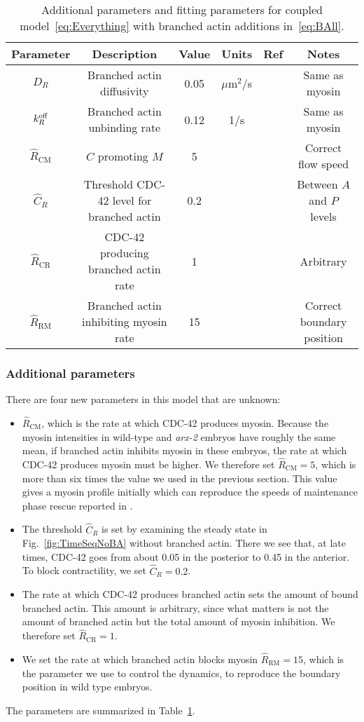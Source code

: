 \documentclass[11pt]{article}
\newcommand{\red}[1]{\color{red}#1\normalcolor}
\newcommand{\6}[1]{#1_{\text{6}}}
\newcommand{\3}[1]{#1_{\text{3}}}
\begin{document}
\begin{table}
\begin{small}
\centering
\begin{tabular}{|c|c|c|c|c|c|}\hline
Parameter & Description & Value & Units & Ref & Notes \\ \hline
$D_R$ & Branched actin diffusivity & 0.05 & $\mu$m$^2$/s & & Same as myosin \\
$k^\text{off}_R$ & Branched actin unbinding rate & 0.12 & 1/s & & Same as myosin \\ \hline
$\hat R_\text{CM}$ & $C$ promoting $M$ & 5 & &  & Correct flow speed\\ 
$\hat C_R$ & Threshold CDC-42 level for branched actin & 0.2 & & & Between $A$ and $P$ levels\\
$\hat R_\text{CR}$ & CDC-42 producing branched actin rate  & 1 & & & Arbitrary\\ 
$\hat R_\text{RM}$ & Branched actin inhibiting myosin rate & 15 & & & Correct boundary position\\  \hline
\end{tabular}
\caption{\label{tab:paramsBR} Additional parameters and fitting parameters for coupled model\ \eqref{eq:Everything} with branched actin additions in\ \eqref{eq:BAll}.}
\end{small}
\end{table}


\subsubsection{Additional parameters}
There are four new parameters in this model that are unknown: 
\begin{itemize}
\item \red{$\hat{R}_\text{CM}$, which is the rate at which CDC-42 produces myosin. Because the myosin intensities in wild-type and \emph{arx-2} embryos have roughly the same mean, if branched actin inhibits myosin in these embryos, the rate at which CDC-42 produces myosin must be higher. We therefore set $\hat{R}_\text{CM}=5$, which is more than six times the value we used in the previous section.} This value gives a myosin profile initially which can reproduce the speeds of maintenance phase rescue reported in \cite[Fig.~7D]{tse2012rhoa}.
\item The threshold $\hat C_R$ is set by examining the steady state in Fig.\ \ref{fig:TimeSeqNoBA} without branched actin. There we see that, at late times, CDC-42 goes from about 0.05 in the posterior to 0.45 in the anterior. To block contractility, we set $\hat C_R=0.2$. 
\item The rate at which CDC-42 produces branched actin sets the amount of bound branched actin. This amount is arbitrary, since what matters is not the amount of branched actin but the total amount of myosin inhibition. We therefore set $\hat R_\text{CR}=1$.
\item We set the rate at which branched actin blocks myosin $\hat R_\text{RM}=15$, which is the parameter we use to control the dynamics, to reproduce the boundary position in wild type embryos. 
\end{itemize}
The parameters are summarized in Table\ \ref{tab:paramsBR}. 
\end{document}
